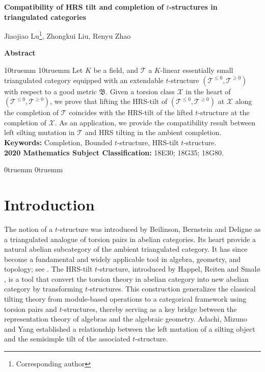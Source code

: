 \documentclass[11pt,a4paper]{amsart}
\date{}
\numberwithin{equation}{section} \theoremstyle{plain}
\numberwithin{equation}{section} \theoremstyle{definition}
\begin{document}
\begin{center}
{\large  \bf  Compatibility of HRS tilt and completion of $t$-structures in triangulated categories}

\vspace{0.5cm}  Jiaojiao Lu\footnote{Corresponding author}, Zhongkui Liu, Renyu Zhao
\end{center}

\bigskip
\centerline { \bf  Abstract}
\medskip

\leftskip10truemm \rightskip10truemm \noindent Let $K$ be a field, and $\mathcal{T}$ a $K$-linear essentially small triangulated category equipped with an extendable $t$-structure $(\mathcal{T}^{\leq0}, \mathcal{T}^{\geq0})$ with respect to a good metric $\mathfrak{B}$. Given a torsion class $\mathcal{X}$ in the heart of $(\mathcal{T}^{\leq0}, \mathcal{T}^{\geq0})$, we prove that lifting the HRS-tilt of $(\mathcal{T}^{\leq0}, \mathcal{T}^{\geq0})$ at $\mathcal{X}$ along the completion of $\mathcal{T}$ coincides with the HRS-tilt of the lifted $t$-structure at the completion of $\mathcal{X}$. As an application, we provide the compatibility result between left silting mutation in $\mathcal{T}$ and HRS tilting in the ambient completion.    \\[2mm]
{\bf Keywords:} Completion, Bounded $t$-structure, HRS-tilt $t$-structure.\\
{\bf 2020 Mathematics Subject Classification:} 18E30; 18G35; 18G80.

\leftskip0truemm \rightskip0truemm
\section { \bf Introduction}
The notion of a $t$-structure was introduced by Beilinson, Bernstein and Deligne \cite{BBD} as a triangulated analogue of torsion pairs in abelian categories. Its heart provide a natural abelian subcategory of the ambient triangulated category. It has since become a fundamental and widely applicable tool in algebra, geometry, and topology; see \cite{B, HKM, KV, S}. The HRS-tilt $t$-structure, introduced by Happel, Reiten and Smal{\o} \cite{HRS}, is a tool that convert the torsion theory in abelian category into new abelian category by transforming $t$-structures. This construction generalizes  the classical tilting theory from module-based operations to a categorical framework using torsion pairs and $t$-structures, thereby serving as a key bridge between the representation theory of algebras and the algebraic geometry. Adachi, Mizuno and Yang \cite{AMY} established a relationship between the left mutation of a silting object and the semisimple tilt of the associated $t$-structure.
\end{document}
